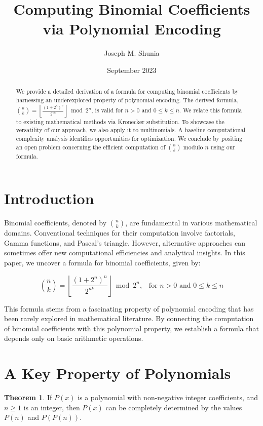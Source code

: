 \documentclass{article}
\title{Computing Binomial Coefficients\\via Polynomial Encoding}
\author{Joseph M. Shunia}
\date{September 2023}
\theoremstyle{plain}
\theoremstyle{definition}
\newtheorem{thm}{Theorem}
\begin{document}
\maketitle
\linespread{1.3}
\begin{abstract}
We provide a detailed derivation of a formula for computing binomial coefficients by harnessing an underexplored property of polynomial encoding. The derived formula, $\binom{n}{k} = \left\lfloor\frac{(1 + 2^{n})^{n}}{2^{n k}}\right\rfloor \bmod{2^{n}}$, is valid for $n > 0$ and $0 \leq k \leq n$. We relate this formula to existing mathematical methods via Kronecker substitution. To showcase the versatility of our approach, we also apply it to multinomials. A baseline computational complexity analysis identifies opportunities for optimization. We conclude by positing an open problem concerning the efficient computation of $\binom{n}{k}$ modulo $n$ using our formula.
\end{abstract}
\linespread{1.0}

\section{Introduction}
Binomial coefficients, denoted by \(\binom{n}{k}\), are fundamental in various mathematical domains. Conventional techniques for their computation involve factorials, Gamma functions, and Pascal's triangle. However, alternative approaches can sometimes offer new computational efficiencies and analytical insights. In this paper, we uncover a formula for binomial coefficients, given by:

\begin{equation}
\binom{n}{k} = \left\lfloor\frac{(1 + 2^{n})^{n}}{2^{n k}}\right\rfloor \bmod{2^{n}} \text{,} \quad \text{for } n > 0 \text{ and } 0 \leq k \leq n
\end{equation}

This formula stems from a fascinating property of polynomial encoding that has been rarely explored in mathematical literature. By connecting the computation of binomial coefficients with this polynomial property, we establish a formula that depends only on basic arithmetic operations.

\section{A Key Property of Polynomials}
\begin{thm}
\label{thm:1}
If \(P(x)\) is a polynomial with non-negative integer coefficients, and \(n \geq 1\) is an integer, then \(P(x)\) can be completely determined by the values $P(n)$ and $P(P(n))$.
\end{thm}
\end{document}
